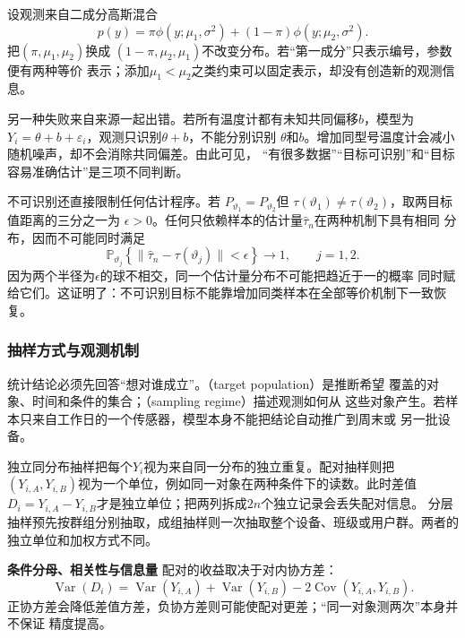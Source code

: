 \begin{example}[混合成分的标签交换]
\label{ex:statistics-mixture-label-switching}
设观测来自二成分高斯混合
\[
  p(y)=\pi\phi(y;\mu_1,\sigma^2)
       +(1-\pi)\phi(y;\mu_2,\sigma^2).
\]
把\((\pi,\mu_1,\mu_2)\)换成
\((1-\pi,\mu_2,\mu_1)\)不改变分布。若“第一成分”只表示编号，参数便有两种等价
表示；添加\(\mu_1<\mu_2\)之类约束可以固定表示，却没有创造新的观测信息。
\end{example}

另一种失败来自来源一起出错。若所有温度计都有未知共同偏移\(b\)，模型为
\(Y_i=\theta+b+\varepsilon_i\)，观测只识别\(\theta+b\)，不能分别识别
\(\theta\)和\(b\)。增加同型号温度计会减小随机噪声，却不会消除共同偏差。由此可见，
“有很多数据”“目标可识别”和“目标容易准确估计”是三项不同判断。

不可识别还直接限制任何估计程序。若
\(P_{\vartheta_1}=P_{\vartheta_2}\)但
\(\tau(\vartheta_1)\neq\tau(\vartheta_2)\)，取两目标值距离的三分之一为
\(\epsilon>0\)。任何只依赖样本的估计量\(\widehat\tau_n\)在两种机制下具有相同
分布，因而不可能同时满足
\[
  \mathbb{P}_{\vartheta_j}
  \left\{\lVert\widehat\tau_n-\tau(\vartheta_j)\rVert<\epsilon\right\}
  \longrightarrow1,\qquad j=1,2.
\]
因为两个半径为\(\epsilon\)的球不相交，同一个估计量分布不可能把趋近于一的概率
同时赋给它们。这证明了：不可识别目标不能靠增加同类样本在全部等价机制下一致恢复。

\subsubsection{抽样方式与观测机制}
\label{sec:statistics-sampling-population}
\label{sec:statistics-missingness-observation}
统计结论必须先回答“想对谁成立”。（target population）是推断希望
覆盖的对象、时间和条件的集合；（sampling regime）描述观测如何从
这些对象产生。若样本只来自工作日的一个传感器，模型本身不能把结论自动推广到周末或
另一批设备。

独立同分布抽样把每个\(Y_i\)视为来自同一分布的独立重复。配对抽样则把
\((Y_{i,A},Y_{i,B})\)视为一个单位，例如同一对象在两种条件下的读数。此时差值
\(D_i=Y_{i,A}-Y_{i,B}\)才是独立单位；把两列拆成\(2n\)个独立记录会丢失配对信息。
分层抽样预先按群组分别抽取，成组抽样则一次抽取整个设备、班级或用户群。两者的
独立单位和加权方式不同。

\par\medskip\noindent\textbf{条件分母、相关性与信息量}\quad
配对的收益取决于对内协方差：
\[
  \operatorname{Var}(D_i)
  =\operatorname{Var}(Y_{i,A})+\operatorname{Var}(Y_{i,B})
   -2\operatorname{Cov}(Y_{i,A},Y_{i,B}).
\]
正协方差会降低差值方差，负协方差则可能使配对更差；“同一对象测两次”本身并不保证
精度提高。


